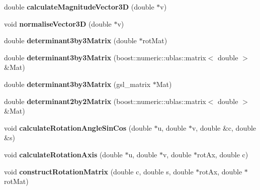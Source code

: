 \begin{DoxyCompactItemize}
\item 
\hypertarget{classShapeBase_ac5d2cfe341eceb73f39d90955356f7b8}{}double {\bfseries calculate\+Magnitude\+Vector3\+D} (double $\ast$v)\label{classShapeBase_ac5d2cfe341eceb73f39d90955356f7b8}

\item 
\hypertarget{classShapeBase_afebf3d9e96e28e5272884f09b61eaab3}{}void {\bfseries normalise\+Vector3\+D} (double $\ast$v)\label{classShapeBase_afebf3d9e96e28e5272884f09b61eaab3}

\item 
\hypertarget{classShapeBase_ade98a5910e7b81ee22da6bcb91262328}{}double {\bfseries determinant3by3\+Matrix} (double $\ast$rot\+Mat)\label{classShapeBase_ade98a5910e7b81ee22da6bcb91262328}

\item 
\hypertarget{classShapeBase_ad86161effaf1c7c607aba51609a99e70}{}double {\bfseries determinant3by3\+Matrix} (boost\+::numeric\+::ublas\+::matrix$<$ double $>$ \&Mat)\label{classShapeBase_ad86161effaf1c7c607aba51609a99e70}

\item 
\hypertarget{classShapeBase_af52dce091d2e8369f546df9adeb1e6c0}{}double {\bfseries determinant3by3\+Matrix} (gsl\+\_\+matrix $\ast$Mat)\label{classShapeBase_af52dce091d2e8369f546df9adeb1e6c0}

\item 
\hypertarget{classShapeBase_a32f1a594c4be91e71f567cc04290a7f5}{}double {\bfseries determinant2by2\+Matrix} (boost\+::numeric\+::ublas\+::matrix$<$ double $>$ \&Mat)\label{classShapeBase_a32f1a594c4be91e71f567cc04290a7f5}

\item 
\hypertarget{classShapeBase_a7c656b4d72103a222e3d9d4d4dc636ca}{}void {\bfseries calculate\+Rotation\+Angle\+Sin\+Cos} (double $\ast$u, double $\ast$v, double \&c, double \&s)\label{classShapeBase_a7c656b4d72103a222e3d9d4d4dc636ca}

\item 
\hypertarget{classShapeBase_acfd90d8e14946c7246e4420ca0ab6a0a}{}void {\bfseries calculate\+Rotation\+Axis} (double $\ast$u, double $\ast$v, double $\ast$rot\+Ax, double c)\label{classShapeBase_acfd90d8e14946c7246e4420ca0ab6a0a}

\item 
\hypertarget{classShapeBase_ac5ea30d81c19c9f7c904af66310c750b}{}void {\bfseries construct\+Rotation\+Matrix} (double c, double s, double $\ast$rot\+Ax, double $\ast$rot\+Mat)\label{classShapeBase_ac5ea30d81c19c9f7c904af66310c750b}


\end{DoxyCompactItemize}
